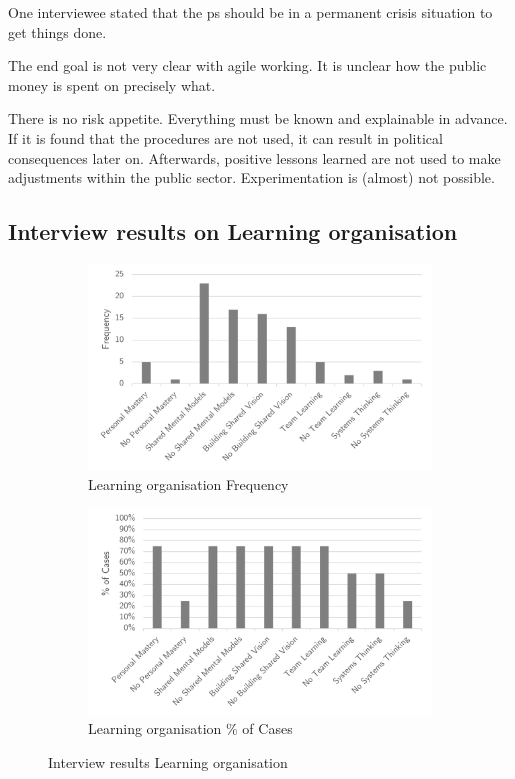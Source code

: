 One interviewee stated that the \gls{ps} should be in a permanent crisis situation to get things done.

The end goal is not very clear with \gls{agile} working. It is unclear how the public money is spent on precisely what. 



There is no risk appetite. Everything must be known and explainable in advance. If it is found that the procedures are not used, it can result in political consequences later on. Afterwards, positive lessons learned are not used to make adjustments within the public sector. Experimentation is (almost) not possible.

\subsection{Interview results on Learning organisation}
\label{sub:interviewresultslearning}
\begin{figure}[H]
	\centering
	\begin{subfigure}[H]{0.5\textwidth}
		\centering
		\includegraphics[width=0.95\linewidth]{images/learningorganisation_frequency}
		\caption{Learning organisation Frequency}
		\label{fig:learningfrequency}
	\end{subfigure}%
	\begin{subfigure}[H]{0.5\textwidth}
		\centering
		\includegraphics[width=0.95\linewidth]{images/learningorganisation_cases}
		\caption{Learning organisation \% of Cases}
		\label{fig:learningcases}
	\end{subfigure}
	\caption{Interview results Learning organisation}
	\label{fig:interviewlearningorganisation}
\end{figure}

